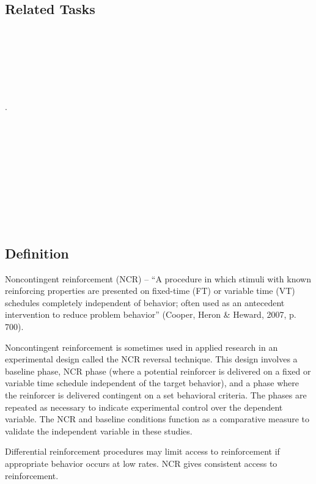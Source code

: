 \subsection{Related Tasks} 
\fourbTen{}\\
\fourcOne{}\\ 
\fourcTwo{}\\ 
\fourcThree{}\\
\fourdOne{}\\
\fourdTwo{}\\.
\fourdFifteen{}\\
\fourdSixteen{}\\
\fourdSeventeen{}\\
\fourdEighteen{}\\
\fourdTwenty{}\\
\fourdTwentyOne{}\\
\fouriSix{}\\
\fouriSeven{}\\
\fourjTwo{}\\
\fourjTen{}\\
%
%
%
%
%
%
%
%
%
%
%
%
%
\section[\fourdTwenty{}]{\fourdTwenty{}%
              }
\subsection{Definition}
Noncontingent reinforcement (NCR) – ``A procedure in which stimuli with known reinforcing properties are presented on fixed-time (FT) or variable time (VT) schedules completely independent of behavior; often used as an antecedent intervention to reduce problem behavior'' (Cooper, Heron \& Heward, 2007, p. 700).

Noncontingent reinforcement is sometimes used in applied research in an experimental design called the NCR reversal technique. This design involves a baseline phase, NCR phase (where a potential reinforcer is delivered on a fixed or variable time schedule independent of the target behavior), and a phase where the reinforcer is delivered contingent on a set behavioral criteria. The phases are repeated as necessary to indicate experimental control over the dependent variable. The NCR and baseline conditions function as a comparative measure to validate the independent variable in these studies.

Differential reinforcement procedures may limit access to reinforcement if appropriate behavior occurs at low rates. NCR gives consistent access to reinforcement. 
%
